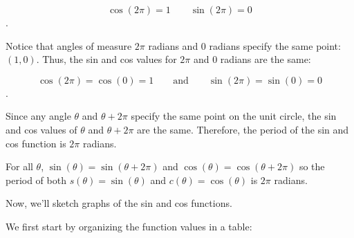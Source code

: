 \begin{itemize}
    \[ \cos (2\pi) = 1 \qquad \sin (2\pi) = 0 \].

    \begin{figure}[H]
      \centering


      \caption{}
      \label{fig:360_degree}
    \end{figure}
\end{itemize}

Notice that angles of measure $2\pi$ radians and $0$ radians specify the same
point: $(1, 0)$. Thus, the sin and cos values for $2\pi$ and $0$ radians are the
same:

\[ \cos (2\pi) = \cos (0) = 1 \qquad \textrm{and} \qquad \sin (2\pi) = \sin (0) = 0\].

Since any angle $\theta$ and $\theta + 2\pi$ specify the same point on the unit
circle, the sin and cos values of $\theta$ and $\theta + 2\pi$ are the same.
Therefore, the period of the sin and cos function is $2\pi$ radians.

\begin{theorem}
  For all $\theta$, $\sin (\theta) = \sin (\theta + 2\pi)$ and $\cos (\theta) =
  \cos(\theta + 2\pi)$ so the period of both $s (\theta) = \sin (\theta)$ and
  $c (\theta) = \cos (\theta)$ is $2\pi$ radians.
\end{theorem}

Now, we'll sketch graphs of the sin and cos functions.

\newpage

We first start by organizing the function values in a table:

